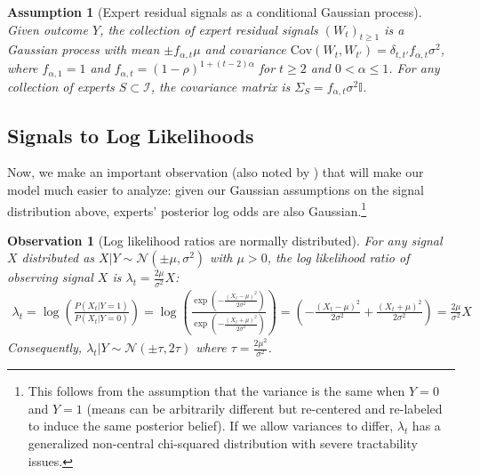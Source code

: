 \documentclass{winnower}
\newtheorem{assumption}{Assumption}
\newtheorem{observation}{Observation}
\begin{document}
\begin{assumption}[Expert residual signals as a conditional Gaussian process]
    Given outcome $Y$, the collection of expert residual signals $\left( W_t \right)_{t\geq 1}$ is a Gaussian process with mean $\pm f_{\alpha, t}\mu$ and covariance $\text{Cov}(W_t, W_{t'}) = \delta_{t, t'}f_{\alpha,t} \sigma^2$, where $f_{\alpha, 1} = 1$ and $f_{\alpha, t} = (1-\rho)^{1+(t-2)\alpha}$ for $t \geq 2$ and $0 < \alpha \leq 1$. For any collection of experts $S \subset \mathcal{I}$, the covariance matrix is $\Sigma_S = f_{\alpha, t}\sigma^2\mathbb{I}$.
\end{assumption}



\subsection{Signals to Log Likelihoods}
Now, we make an important observation (also noted by \citet{dasaratha2019aggregative}) that will make our model much easier to analyze: given our Gaussian assumptions on the signal distribution above, experts' posterior log odds are also Gaussian.\footnote{This follows from the assumption that the variance is the same when $Y=0$ and $Y=1$ (means can be arbitrarily different but re-centered and re-labeled to induce the same posterior belief). If we allow variances to differ, $\lambda_t$ has a generalized non-central chi-squared distribution with severe tractability issues.} 

\begin{observation}[Log likelihood ratios are normally distributed]
    For any signal $X$ distributed as $X|Y \sim \mathcal{N}\left( \pm \mu, \sigma^2\right)$ with $\mu > 0$, the log likelihood ratio of observing signal $X$ is $\lambda_t = \frac{2\mu}{\sigma^2}X$:
    {\small
\begin{equation}
    \begin{split}
    \lambda_{t} = \log \left( \frac{P(X_t|Y=1)}{P(X_t|Y=0)}\right) = \log \left( \frac{\exp\left( -\frac{(X_t - \mu)^2}{2\sigma^2}  \right)}{\exp\left( -\frac{(X_t + \mu)^2}{2\sigma^2} \right)}\right) =  \left( -\frac{(X_t - \mu)^2}{2\sigma^2} + \frac{(X_t + \mu)^2}{2\sigma^2}  \right) 
    =  \frac{2\mu}{\sigma^2}X 
    \end{split}
\end{equation}
}
Consequently, $\lambda_t|Y \sim \mathcal{N}\left(\pm \tau, 2\tau \right)$ where $\tau = \frac{2\mu^2}{\sigma^2}$.
\end{observation}
\end{document}
